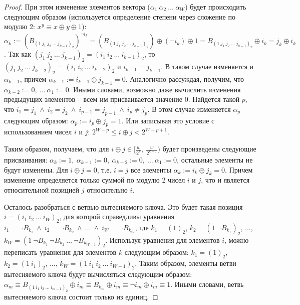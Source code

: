 \begin{proof}
  При этом изменение элементов вектора
  ($\alpha_1~\alpha_2~\dots~\alpha_W$) будет происходить следующим  образом (используется определение степени через сложение по модулю 2: $x^y \equiv x \oplus y \oplus 1$): $\alpha_k :=
  (B_{(1~j_1~j_2~\dots~j_{k-1})_2})^{\neg i_k} =
  (B_{(1~j_1~j_2~\dots~j_{k-1})_2}) \oplus (\neg i_k) \oplus 1 =
  B_{(1~j_1~j_2~\dots~j_{k-1})_2} \oplus i_k = j_k \oplus i_k$. Так как $(j_1~j_2~\dots~j_{k-1})_2 = (i_1~i_2~\dots~i_{k-1})_2$, то $(j_1~j_2~\dots~j_{k-2})_2 = (i_1~i_2~\dots~i_{k-2})_2$ и $i_{k-1} = j_{k-1}$. В таком случае изменяется и $\alpha_{k-1}$, причем $\alpha_{k-1} := i_{k-1} \oplus j_{k-1} = 0$. Аналогично
  рассуждая, получим, что $\alpha_{k-2} := 0,~\dots~\alpha_1 := 0$.
  Иными словами, возможно даже вычислить изменения предыдущих
  элементов -- всем им присваивается значение 0. Найдется такой $p$,
  что $i_1 = j_1~\wedge~i_2 = j_2~\wedge~i_{p-1} =
  j_{p-1}~\wedge~i_p \neq j_p$. В этом случае изменяется
  $\alpha_p$ следующим образом: $\alpha_p := i_p \oplus j_p = 1$.
  Или записывая это условие с использованием чисел $i$ и $j$: $2^{W-p} \leqslant i
  \oplus j < 2^{W-p+1}$.

  Таким образом, получаем, что для $i \oplus j \in
  [\frac{w}{2^k},~\frac{w}{2^{k-1}})$ будет произведены следующие
  присваивания: $\alpha_k := 1,~\alpha_{k-1} := 0,~\alpha_{k-2} :=
  0,~\dots~\alpha_1 := 0$, остальные элементы не будут изменены. Для
  $i \oplus j = 0$, т.е. $i = j$ все элементы $\alpha_k := i_k \oplus
  j_k = 0$. Причем изменение определяется только суммой по модулю 2
  чисел $i$ и $j$, что и является относительной позицией $j$
  относительно $i$.

  Осталось разобраться с ветвью вытесняемого ключа. Это будет такая
  позиция $i = (i_1~i_2~\dots~i_W)_2$, для которой справедливы
  уравнения $i_1 = \neg B_{k_1}~\wedge~i_2 = \neg
  B_{k_2}~\wedge~\dots~\wedge~i_W = \neg B_{k_W}$, где $k_1 = (1)_2$,
  $k_2 = (1~\neg B_{k_1})_2$, ..., $k_W = (1~\neg B_{k_1}~\neg
  B_{k_2}~\dots~\neg B_{k_{W-1}})_2$. Используя уравнения для
  элементов $i$, можно переписать уравнения для элементов $k$
  следующим образом: $k_1 = (1)_2$,
  $k_2 = (1~i_1)_2$, ..., $k_W = (1~i_1~i_2~\dots~i_{W-1})_2$. Таким
  образом, элементы ветви вытесняемого ключа будут вычисляться
  следующим образом: $\alpha_m \equiv B_{(1~i_1~i_2~\dots~i_{m-1})_2}
  \oplus i_m \equiv B_{k_m} \oplus i_m \equiv \neg i_m \oplus i_m
  \equiv 1$. Иными словами, ветвь вытесняемого ключа состоит только
  из единиц.
\end{proof}

